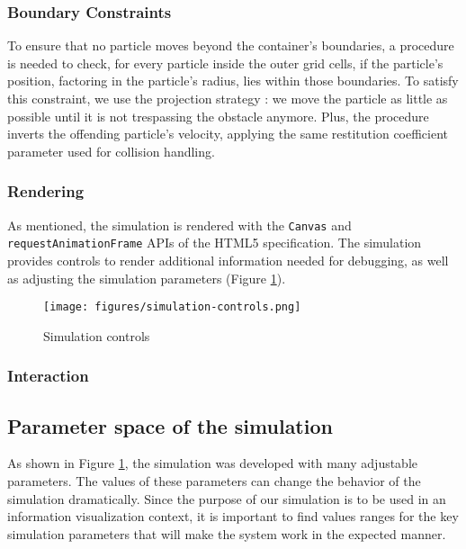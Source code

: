 \documentclass[manuscript, screen]{timtm}
\begin{document}
\subsubsection{Boundary Constraints}

To ensure that no particle moves beyond the container's boundaries, a procedure is needed to check, for every particle inside the outer grid cells, if the particle's position, factoring in the particle's radius, lies within those boundaries. To satisfy this constraint, we use the projection strategy \cite{jakobsen2001advanced}: we move the particle as little as possible until it is not trespassing the obstacle anymore. Plus, the procedure inverts the offending particle's velocity, applying the same restitution coefficient parameter used for collision handling.

\subsubsection{Rendering}

As mentioned, the simulation is rendered with the \texttt{Canvas} and \texttt{requestAnimationFrame} APIs of the HTML5 specification. The simulation provides controls to render additional information needed for debugging, as well as adjusting the simulation parameters (Figure \ref{fig:controls}).

\begin{figure}[h]
  \centering
  \texttt{[image: figures/simulation-controls.png]}
  \caption{Simulation controls}
  \label{fig:controls}
\end{figure}

\subsubsection{Interaction}

\subsection{Parameter space of the simulation} \label{method-parameters}

As shown in Figure \ref{fig:controls}, the simulation was developed with many adjustable parameters. The values of these parameters can change the behavior of the simulation dramatically. Since the purpose of our simulation is to be used in an information visualization context, it is important to find values ranges for the key simulation parameters that will make the system work in the expected manner.
\end{document}
